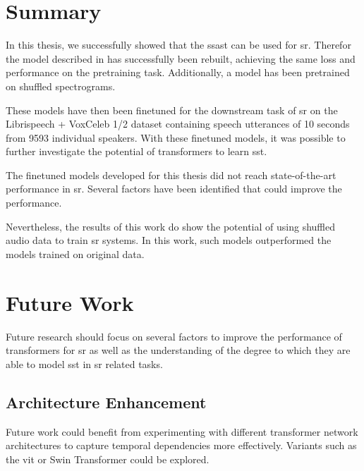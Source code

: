 


\section{Summary}
In this thesis, we successfully showed that the \gls{ssast} can be used for \gls{sr}. Therefor the model described in \cite{gong2022ssast} has successfully been rebuilt, achieving the same loss and performance on the pretraining task. Additionally, a model has been pretrained on shuffled spectrograms.

These models have then been finetuned for the downstream task of \gls{sr} on the Librispeech + VoxCeleb 1/2 dataset containing speech utterances of 10 seconds from 9593 individual speakers. With these finetuned models, it was possible to further investigate the potential of transformers to learn \gls{sst}.

The finetuned models developed for this thesis did not reach state-of-the-art performance in \gls{sr}. Several factors have been identified that could improve the performance.

Nevertheless, the results of this work do show the potential of using shuffled audio data to train \gls{sr} systems. In this work, such models outperformed the models trained on original data.

\section{Future Work}

Future research should focus on several factors to improve the performance of transformers for \gls{sr} as well as the understanding of the degree to which they are able to model \gls{sst} in \gls{sr} related tasks.

\subsection{Architecture Enhancement}
Future work could benefit from experimenting with different transformer network architectures to capture temporal dependencies more effectively. Variants such as the \gls{vit} or Swin Transformer could be explored.

